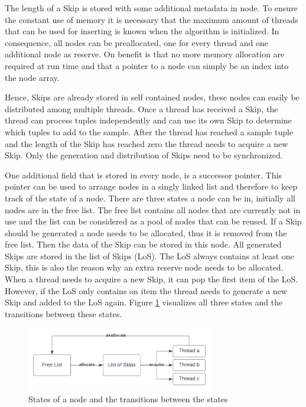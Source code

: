\documentclass[sigconf,nonacm]{acmart}
\begin{document}
        The length of a Skip is stored with some additional metadata in node. To ensure the constant use of memory it is necessary that the maximum amount of threads that can be used for inserting is known when the algorithm is initialized. In consequence, all nodes can be preallocated, one for every thread and one additional node as reserve. On benefit is that no more memory allocation are required at run time and that a pointer to a node can simply be an index into the node array.

        Hence, Skips are already stored in self contained nodes, these nodes can easily be distributed among multiple threads. Once a thread has received a Skip, the thread can process tuples independently and can use its own Skip to determine which tuples to add to the sample. After the thread has reached a sample tuple and the length of the Skip has reached zero the thread needs to acquire a new Skip. Only the generation and distribution of Skips need to be synchronized.

        One additional field that is stored in every node, is a successor pointer. This pointer can be used to arrange nodes in a singly linked list and therefore to keep track of the state of a node. There are three states a node can be in, initially all nodes are in the free list. The free list contains all nodes that are currently not in use and the list can be considered as a pool of nodes that can be reused. If a Skip should be generated a node needs to be allocated, thus it is removed from the free list. Then the data of the Skip can be stored in this node. All generated Skips are stored in the list of Skips (LoS). The LoS always contains at least one Skip, this is also the reason why an extra reserve node needs to be allocated. When a thread needs to acquire a new Skip, it can pop the first item of the LoS. However, if the LoS only contains on item the thread needs to generate a new Skip and added to the LoS again. Figure \ref{fig:lifecycle} visualizes all three states and the transitions between these states.
        \begin{figure}[h]
            \includegraphics[height=2.8cm]{figure2.pdf}
            \caption{States of a node and the transitions between the states}
            \label{fig:lifecycle}
        \end{figure}
\end{document}
